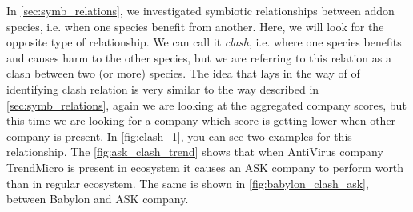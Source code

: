 \documentclass[11pt,oneside]{book}
\begin{document}
In \autoref{sec:symb_relations}, we investigated symbiotic relationships between addon species, i.e. when one species benefit from another. Here, we will look for the opposite type of relationship. We can call it \emph{clash}, i.e. where one species benefits and causes harm to the other species, but we are referring to this relation as a clash between two (or more) species. The idea that lays in the way of of identifying clash relation is very similar to the way described in \autoref{sec:symb_relations}, again we are looking at the aggregated company scores, but this time we are looking for a company which score is getting lower when other company is present. In \autoref{fig:clash_1}, you can see two examples for this relationship. The \autoref{fig:ask_clash_trend} shows that when AntiVirus company TrendMicro is present in ecosystem it causes an ASK company to perform worth than in regular ecosystem. The same is shown in \autoref{fig:babylon_clash_ask}, between Babylon and ASK company.

\end{document}
